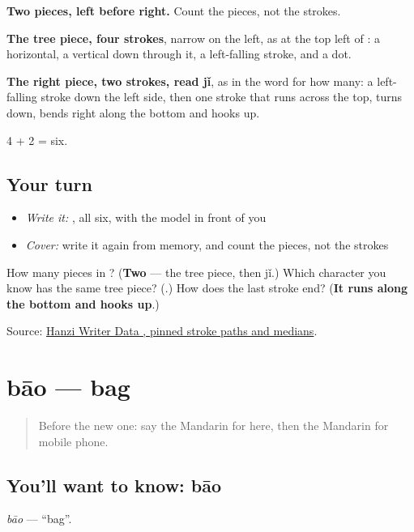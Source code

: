 \begin{quote}
\end{quote}

\textbf{Two pieces, left before right.} Count the pieces, not the strokes.

\textbf{The tree piece, four strokes}, narrow on the left, as at the top left of : a horizontal, a vertical down through it, a left-falling stroke, and a dot.

\textbf{The right piece, two strokes, read jǐ}, as in the word for how many: a left-falling stroke down the left side, then one stroke that runs across the top, turns down, bends right along the bottom and hooks up.

4 + 2 = six.

\subsection*{Your turn}
\begin{itemize}
\raggedright
  \item \emph{Write it:} , all six, with the model in front of you
  \item \emph{Cover:} write it again from memory, and count the pieces, not the strokes
\end{itemize}

\begin{tcolorbox}[breakable,colback=teal!4,colframe=teal!35!black,title={Before you move on}]
How many pieces in ? (\textbf{Two} — the tree piece, then jǐ.) Which character you know has the same tree piece? (\textbf{}.) How does the last stroke end? (\textbf{It runs along the bottom and hooks up}.)

Source: \href{https://raw.githubusercontent.com/chanind/hanzi-writer-data/68d10a4b21150cae5e1ebbd223eed289cf32d90c/data/\%E6\%9C\%BA.json}{Hanzi Writer Data , pinned stroke paths and medians}.
\end{tcolorbox}
\section[bāo]{bāo — bag}

\label{lesson:ZH-C58-bao}



\begin{quote}
Before the new one: say the Mandarin for here, then the Mandarin for mobile phone.
\end{quote}

\subsection*{You'll want to know: bāo}
\emph{bāo} — \textquotedblleft{}bag\textquotedblright{}.

